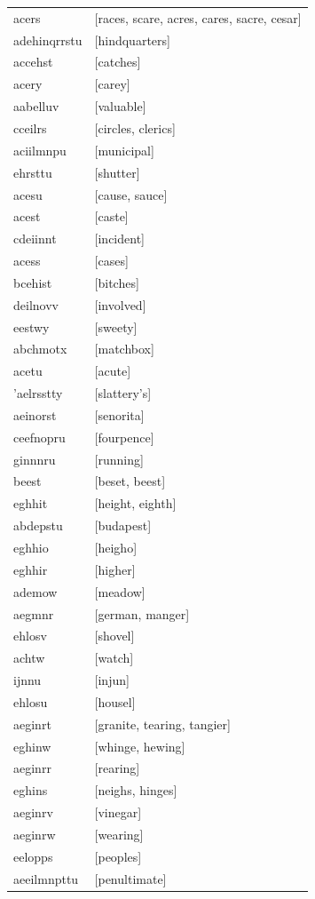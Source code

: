 \documentclass{article}
\begin{document}
\begin{tabular}{ll}
acers & [races, scare, acres, cares, sacre, cesar] \\
adehinqrrstu & [hindquarters] \\
accehst & [catches] \\
acery & [carey] \\
aabelluv & [valuable] \\
cceilrs & [circles, clerics] \\
aciilmnpu & [municipal] \\
ehrsttu & [shutter] \\
acesu & [cause, sauce] \\
acest & [caste] \\
cdeiinnt & [incident] \\
acess & [cases] \\
bcehist & [bitches] \\
deilnovv & [involved] \\
eestwy & [sweety] \\
abchmotx & [matchbox] \\
acetu & [acute] \\
'aelrsstty & [slattery's] \\
aeinorst & [senorita] \\
ceefnopru & [fourpence] \\
ginnnru & [running] \\
beest & [beset, beest] \\
eghhit & [height, eighth] \\
abdepstu & [budapest] \\
eghhio & [heigho] \\
eghhir & [higher] \\
ademow & [meadow] \\
aegmnr & [german, manger] \\
ehlosv & [shovel] \\
achtw & [watch] \\
ijnnu & [injun] \\
ehlosu & [housel] \\
aeginrt & [granite, tearing, tangier] \\
eghinw & [whinge, hewing] \\
aeginrr & [rearing] \\
eghins & [neighs, hinges] \\
aeginrv & [vinegar] \\
aeginrw & [wearing] \\
eelopps & [peoples] \\
aeeilmnpttu & [penultimate] \\

\end{tabular}
\end{document}
